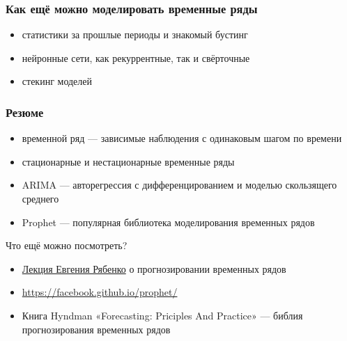 \documentclass[fullscreen=true, bookmarks=true, hyperref={pdfencoding=unicode}]{beamer}
\begin{document}
\begin{frame}
  \frametitle{Как ещё можно моделировать временные ряды}
  \begin{itemize}
    \item статистики за прошлые периоды и знакомый бустинг
    \item нейронные сети, как рекуррентные, так и свёрточные
    \item стекинг моделей
  \end{itemize}
\end{frame}


\begin{frame}
  \frametitle{Резюме}
  \begin{itemize}
    \item временной ряд — зависимые наблюдения с одинаковым шагом по времени
    \item стационарные и нестационарные временные ряды
    \item ARIMA — авторегрессия с дифференцированием и моделью скользящего среднего
    \item Prophet — популярная библиотека моделирования временных рядов
  \end{itemize}
  \pause
  Что ещё можно посмотреть?
  \begin{itemize}
    \item \href{https://www.youtube.com/watch?v=u433nrxdf5k}{Лекция Евгения Рябенко} о прогнозировании временных рядов
    \item \href{https://facebook.github.io/prophet/}{https://facebook.github.io/prophet/}
    \item Книга Hyndman «Forecasting: Priciples And Practice» — библия прогнозирования временных рядов
  \end{itemize}
\end{frame}
\end{document}
